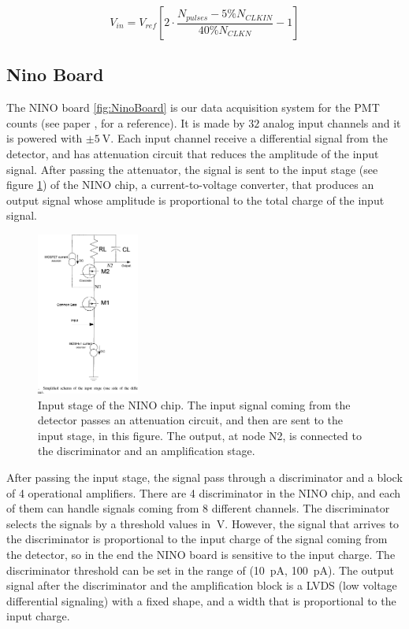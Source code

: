 \begin{equation} \label{eq:Vfc}
V_{in} =  V_{ref}[2 \cdot \dfrac{N_{pulses} - 5 \% N_{CLKIN}}{40 \% N_{CLKN}} - 1]
\end{equation}

\subsection{Nino Board} \label{NINO}

The NINO board \ref{fig:NinoBoard} is our data acquisition system for the PMT counts (see paper \cite{1352067}, for a reference). It is made by $32$ analog input channels and it is powered with $\pm \SI{5}{\volt}$.
Each input channel receive a differential signal from the detector, and has attenuation circuit that reduces the amplitude of the input signal. After passing the attenuator, the signal is sent to the input stage (see figure \ref{fig:InputStage}) of the NINO chip, a current-to-voltage converter, that produces an output signal whose amplitude is proportional to the total charge of the input signal.

\begin{figure}[hbtp]
\centering
\includegraphics[width = 0.3\textwidth]{ExperimentalSetup/InputStage.png}
\caption{Input stage of the NINO chip. The input signal coming from the detector passes an attenuation circuit, and then are sent to the input stage, in this figure. The output, at node N2, is connected to the discriminator and an amplification stage.}
\label{fig:InputStage}
\end{figure}

After passing the input stage, the signal pass through a discriminator and a block of 4 operational amplifiers.
There are 4 discriminator in the NINO chip, and each of them can handle signals coming from $8$ different channels. The discriminator selects the signals by a threshold values in $\SI{}{\volt}$. However, the signal that arrives to the discriminator is proportional to the input charge of the signal coming from the detector, so in the end the NINO board is sensitive to the input charge. The discriminator threshold can be set in the range of (\SI{10}{\pico \ampere}, \SI{100}{\pico \ampere}). 
The output signal after the discriminator and the amplification block is a LVDS (low voltage differential signaling) with a fixed shape, and a width that is proportional to the input charge.
 
